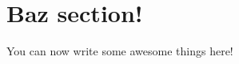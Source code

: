 \documentclass{neontex}
\begin{document}
    \maketitle
    \tableofcontents

    \section{Baz section!}
    You can now write some awesome things here!
\end{document}
